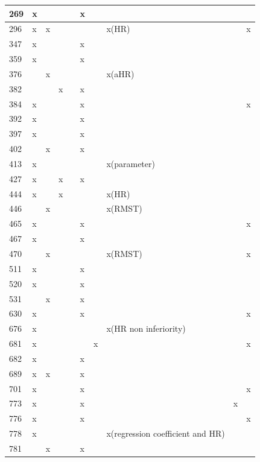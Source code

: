 \begin{landscape}
\begin{longtable}{|p{0.3in}|p{0.4in}|p{0.4in}|p{0.4in}|p{0.3in}|p{0.4in}|p{0.4in}|p{1.0in}|p{0.65in}|p{0.8in}|}
269 & x &  &  &  & x &  &  &  &  \\ \hline 
296 & x & x &  &  &  &  & x(HR) &  & x \\ \hline 
347 & x &  &  &  & x &  &  &  &  \\ \hline 
359 & x &  &  &  & x &  &  &  &  \\ \hline 
376 &  & x &  &  &  &  & x(aHR) &  &  \\ \hline 
382 &  &  & x &  & x &  &  &  &  \\ \hline 
384 & x &  &  &  & x &  &  &  & x \\ \hline 
392 & x &  &  &  & x &  &  &  &  \\ \hline 
397 & x &  &  &  & x &  &  &  &  \\ \hline 
402 &  & x &  &  & x &  &  &  &  \\ \hline 
413 & x &  &  &  &  &  & x(parameter) &  &  \\ \hline 
427 & x &  & x &  & x &  &  &  &  \\ \hline 
444 & x &  & x &  &  &  & x(HR) &  &  \\ \hline 
446 &  & x &  &  &  &  & x(RMST) &  &  \\ \hline 
465 & x &  &  &  & x &  &  &  & x \\ \hline 
467 & x &  &  &  & x &  &  &  &  \\ \hline 
470 &  & x &  &  &  &  & x(RMST) &  & x \\ \hline 
511 & x &  &  &  & x &  &  &  &  \\ \hline 
520 & x &  &  &  & x &  &  &  &  \\ \hline 
531 &  & x &  &  & x &  &  &  &  \\ \hline 
630 & x &  &  &  & x &  &  &  & x \\ \hline 
676 & x &  &  &  &  &  & x(HR non inferiority) &  &  \\ \hline 
681 & x &  &  &  &  & x &  &  & x \\ \hline 
682 & x &  &  &  & x &  &  &  &  \\ \hline 
689 & x & x &  &  & x &  &  &  &  \\ \hline 
701 & x &  &  &  & x &  &  &  & x \\ \hline 
773 & x &  &  &  & x &  &  & x &  \\ \hline 
776 & x &  &  &  & x &  &  &  & x \\ \hline 
778 & x &  &  &  &  &  & x(regression coefficient and HR) &  &  \\ \hline 
781 &  & x &  &  & x &  &  &  &  \\ \hline 

\end{longtable}
\end{landscape}
